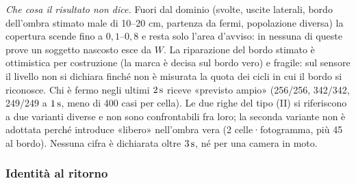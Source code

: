 \emph{Che cosa il risultato non dice.} Fuori dal dominio (svolte, uscite laterali, bordo dell'ombra stimato male di 10–20 cm, partenza da fermi, popolazione diversa) la copertura scende fino a $0{,}1$–$0{,}8$ e resta solo l'area d'avviso: in nessuna di queste prove un soggetto nascosto esce da $W$. La riparazione del bordo stimato è ottimistica per costruzione (la marca è decisa sul bordo vero) e fragile: sul sensore il livello non si dichiara finché non è misurata la quota dei cicli in cui il bordo si riconosce. Chi è fermo negli ultimi $2\,\mathrm{s}$ riceve «previsto ampio» (256/256, 342/342, 249/249 a $1\,\mathrm{s}$, meno di 400 casi per cella). Le due righe del tipo (II) si riferiscono a due varianti diverse e non sono confrontabili fra loro; la seconda variante non è adottata perché introduce «libero» nell'ombra vera (2 celle·fotogramma, più 45 al bordo). Nessuna cifra è dichiarata oltre $3\,\mathrm{s}$, né per una camera in moto.

\subsubsection*{Identità al ritorno}

